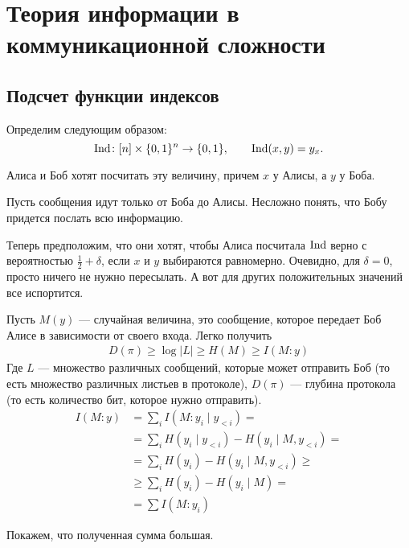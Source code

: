 \section{Теория информации в коммуникационной сложности}
\subsection{Подсчет функции индексов}
\begin{defn}
Определим  следующим образом:
 \[
	\operatorname{Ind} \colon [n]\times \{0, 1\}^{n} \to \{0, 1\}, \qquad \operatorname{Ind}(x, y) = y_x
.\] 
\end{defn}
Алиса и Боб хотят посчитать эту величину, причем $ x$ у Алисы, а  $ y $ у Боба.

Пусть сообщения идут только от Боба до Алисы. Несложно понять, что Бобу придется послать всю информацию.

Теперь предположим, что они хотят, чтобы Алиса посчитала $ \operatorname{Ind}$  верно с вероятностью $ \frac{1}{2} + \delta $, если $ x$ и $ y$ выбираются равномерно. Очевидно, для $  \delta  = 0$, просто ничего не нужно пересылать. А вот для других положительных значений все испортится.

\dotfill

Пусть $ M(y)$ --- случайная величина, это сообщение, которое передает Боб Алисе в зависимости от своего входа. Легко получить
\begin{align*}
    D(\pi) \ge \log \lvert L \rvert  \ge H(M) \ge I(M : y)
\end{align*}
Где $L$ --- множество различных сообщений, которые может отправить Боб (то есть множество различных листьев в протоколе), $ D(\pi)$ --- глубина протокола (то есть количество бит, которое нужно отправить). 
\begin{align*}
	I(M : y)& = \tag{Chain rule} 
			\sum_{i} I(M: y_i \mid y_{<i}) = \\
			&= \sum_i H(y_i \mid y_{<i}) - H(y_i \mid M, y_{<i}) = \tag{$ y_i$ независимы} \\
			&= \sum_i H(y_i) - H(y_i \mid M, y_{<i}) \ge \tag{Выкинули часть условий} \\
			& \ge \sum_i H(y_i) - H(y_i \mid M) = \\
			&= \sum I(M : y_i)
\end{align*}

Покажем, что полученная сумма большая.

